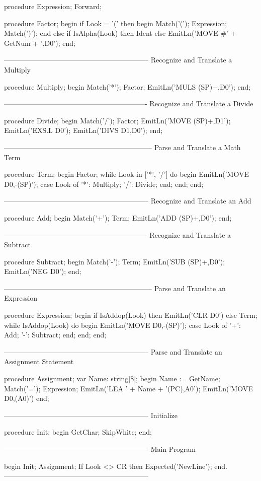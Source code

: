 \documentclass[float=false, crop=false]{standalone}
\begin{document}
\begin{code}
procedure Expression; Forward;

procedure Factor;
begin
   if Look = '(' then begin
      Match('(');
      Expression;
      Match(')');
      end
   else if IsAlpha(Look) then
      Ident
   else
      EmitLn('MOVE #' + GetNum + ',D0');
end;


{--------------------------------------------------------------}
{ Recognize and Translate a Multiply }

procedure Multiply;
begin
   Match('*');
   Factor;
   EmitLn('MULS (SP)+,D0');
end;


{-------------------------------------------------------------}
{ Recognize and Translate a Divide }

procedure Divide;
begin
   Match('/');
   Factor;
   EmitLn('MOVE (SP)+,D1');
   EmitLn('EXS.L D0');
   EmitLn('DIVS D1,D0');
end;


{---------------------------------------------------------------}
{ Parse and Translate a Math Term }

procedure Term;
begin
   Factor;
   while Look in ['*', '/'] do begin
      EmitLn('MOVE D0,-(SP)');
      case Look of
       '*': Multiply;
       '/': Divide;
      end;
   end;
end;


{--------------------------------------------------------------}
{ Recognize and Translate an Add }

procedure Add;
begin
   Match('+');
   Term;
   EmitLn('ADD (SP)+,D0');
end;


{-------------------------------------------------------------}
{ Recognize and Translate a Subtract }

procedure Subtract;
begin
   Match('-');
   Term;
   EmitLn('SUB (SP)+,D0');
   EmitLn('NEG D0');
end;


{---------------------------------------------------------------}
{ Parse and Translate an Expression }

procedure Expression;
begin
   if IsAddop(Look) then
      EmitLn('CLR D0')
   else
      Term;
   while IsAddop(Look) do begin
      EmitLn('MOVE D0,-(SP)');
      case Look of
       '+': Add;
       '-': Subtract;
      end;
   end;
end;


{--------------------------------------------------------------}
{ Parse and Translate an Assignment Statement }

procedure Assignment;
var Name: string[8];
begin
   Name := GetName;
   Match('=');
   Expression;
   EmitLn('LEA ' + Name + '(PC),A0');
   EmitLn('MOVE D0,(A0)')
end;


{--------------------------------------------------------------}
{ Initialize }

procedure Init;
begin
   GetChar;
   SkipWhite;
end;


{--------------------------------------------------------------}
{ Main Program }

begin
   Init;
   Assignment;
   If Look <> CR then Expected('NewLine');
end.
{--------------------------------------------------------------}
\end{code}
\end{document}
